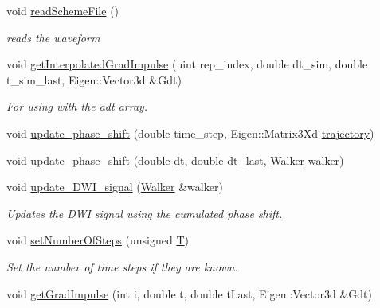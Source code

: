 \begin{DoxyCompactItemize}
\mbox{\label{class_gradient_waveform_a82da8e7b3bffe4557e6e38191b7f8d81}} 
void \hyperlink{class_gradient_waveform_a82da8e7b3bffe4557e6e38191b7f8d81}{read\+Scheme\+File} ()
\begin{DoxyCompactList}\small\item\em reads the waveform \end{DoxyCompactList}\item 
\mbox{\label{class_gradient_waveform_a2f1449c026649e4601f773086d1346ce}} 
void \hyperlink{class_gradient_waveform_a2f1449c026649e4601f773086d1346ce}{get\+Interpolated\+Grad\+Impulse} (uint rep\+\_\+index, double dt\+\_\+sim, double t\+\_\+sim\+\_\+last, Eigen\+::\+Vector3d \&Gdt)
\begin{DoxyCompactList}\small\item\em For using with the adt array. \end{DoxyCompactList}\item 
void \hyperlink{class_gradient_waveform_a2c606400c648cebd85827efa8d22b6bc}{update\+\_\+phase\+\_\+shift} (double time\+\_\+step, Eigen\+::\+Matrix3\+Xd \hyperlink{class_gradient_waveform_a83a7c844f86acee3b7ab12e7e70202af}{trajectory})
\item 
void \hyperlink{class_gradient_waveform_a7421301b24b6c98e28ef9430287cdf8e}{update\+\_\+phase\+\_\+shift} (double \hyperlink{class_gradient_waveform_a3eacca54a58dc574384f07899a9a6da3}{dt}, double dt\+\_\+last, \hyperlink{class_walker}{Walker} walker)
\item 
\mbox{\label{class_gradient_waveform_af4291596da9c45247b0748d945bd9b54}} 
void \hyperlink{class_gradient_waveform_af4291596da9c45247b0748d945bd9b54}{update\+\_\+\+D\+W\+I\+\_\+signal} (\hyperlink{class_walker}{Walker} \&walker)
\begin{DoxyCompactList}\small\item\em Updates the D\+WI signal using the cumulated phase shift. \end{DoxyCompactList}\item 
\mbox{\label{class_gradient_waveform_a040d4a70dc7951c235010791e1c581d1}} 
void \hyperlink{class_gradient_waveform_a040d4a70dc7951c235010791e1c581d1}{set\+Number\+Of\+Steps} (unsigned \hyperlink{class_gradient_waveform_af2f45ff237ba41afe3ff5cedb7c1c966}{T})
\begin{DoxyCompactList}\small\item\em Set the number of time steps if they are known. \end{DoxyCompactList}\item 
void \hyperlink{class_gradient_waveform_a80dd810cb4e5a11dec311ac87e55ea18}{get\+Grad\+Impulse} (int i, double t, double t\+Last, Eigen\+::\+Vector3d \&Gdt)
\end{DoxyCompactItemize}
